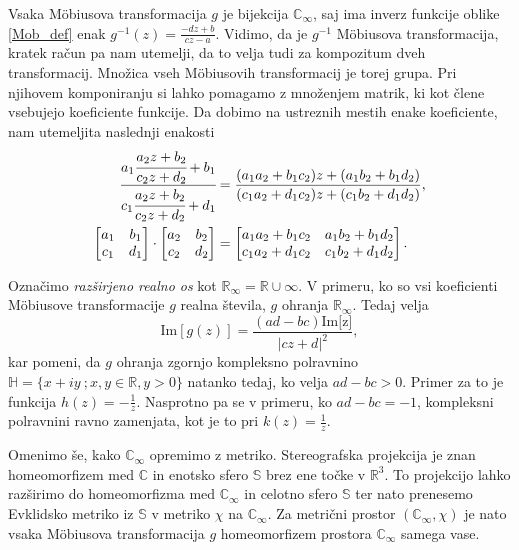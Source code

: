 \documentclass[a4paper,12pt]{article}
\def\R{\mathbb{R}} %
\def\C{\mathbb{C}} %
\def\Ci{\mathbb{C}_{\infty}} %
\def\H{\mathbb{H}} %
\begin{document}
Vsaka M\"obiusova transformacija $g$ je bijekcija $\Ci$, saj ima inverz funkcije oblike \eqref{Mob_def} enak $g^{-1}(z) = \frac{-dz + b}{cz - a}$. Vidimo, da je $g^{-1}$ M\"obiusova transformacija, kratek račun pa nam utemelji, da to velja tudi za kompozitum dveh transformacij. Množica vseh M\"obiusovih transformacij je torej grupa. Pri njihovem komponiranju si lahko pomagamo z množenjem matrik, ki kot člene vsebujejo koeficiente funkcije. Da dobimo na ustreznih mestih enake koeficiente, nam utemeljita naslednji enakosti
\begin{align*}
    \cfrac{a_1\cfrac{a_2z + b_2}{c_2z + d_2} + b_1}{c_1\cfrac{a_2z + b_2}{c_2z + d_2} + d_1} &= \frac{(a_1a_2 + b_1c_2)z + (a_1b_2 + b_1d_2)}{(c_1a_2 + d_1c_2)z + (c_1b_2+d_1d_2)},
    \\
    \begin{bmatrix}
        a_1 & b_1\\
        c_1 & d_1
    \end{bmatrix}
    \cdot
    \begin{bmatrix}
        a_2 & b_2\\
        c_2 & d_2
    \end{bmatrix}
    &=
    \begin{bmatrix}
        a_1a_2 + b_1c_2 & a_1b_2 + b_1d_2\\
        c_1a_2 + d_1c_2 & c_1b_2+d_1d_2
    \end{bmatrix}.
\end{align*}

Označimo \emph{razširjeno realno os} kot $\R_{\infty} = \R \cup \infty$. 
V primeru, ko so vsi koeficienti M\"obiusove transformacije $g$ realna števila, $g$ ohranja $\R_{\infty}$. Tedaj velja
\[
    \text{Im}[g(z)] = \frac{(ad - bc)\text{Im[z]}}{|cz + d|^2},
\]
kar pomeni, da $g$ ohranja zgornjo kompleksno polravnino $\H = \{x + iy\ ; x, y \in \R, y > 0\}$ natanko tedaj, ko velja $ad - bc > 0$. Primer za to je funkcija $h(z) = - \frac{1}{z}$. Nasprotno pa se v primeru, ko $ad - bc = -1$, kompleksni polravnini ravno zamenjata, kot je to pri $k(z) = \frac{1}{z}$.

Omenimo še, kako $\Ci$ opremimo z metriko. Stereografska projekcija je znan 
homeomorfizem med $\C$ in enotsko sfero $\mathbb{S}$ brez ene točke v $\R^3$. To projekcijo lahko razširimo do homeomorfizma med $\Ci$ in celotno sfero $\mathbb{S}$ ter nato prenesemo Evklidsko metriko iz $\mathbb{S}$ v metriko $\chi$ na $\Ci$. Za metrični prostor $(\Ci, \chi)$ je nato vsaka M\"obiusova transformacija $g$ homeomorfizem prostora $\Ci$ samega vase.
\end{document}
